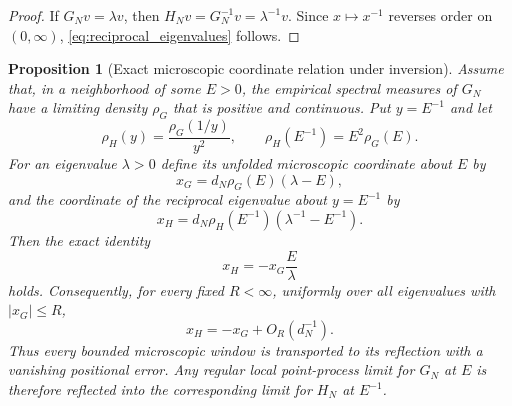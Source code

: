 \documentclass[11pt]{amsart}
\numberwithin{equation}{section}
\theoremstyle{plain}
\newtheorem{proposition}[theorem]{Proposition}
\theoremstyle{definition}
\theoremstyle{remark}
\begin{document}
\begin{proof}
If $G_Nv=\lambda v$, then $H_Nv=G_N^{-1}v=\lambda^{-1}v$.  Since $x\mapsto x^{-1}$ reverses order on $(0,\infty)$, \eqref{eq:reciprocal_eigenvalues} follows.
\end{proof}

\begin{proposition}[Exact microscopic coordinate relation under inversion]
\label{prop:local_inversion_equivalence}
Assume that, in a neighborhood of some $E>0$, the empirical spectral measures of $G_N$ have a limiting density $\rho_G$ that is positive and continuous.  Put $y=E^{-1}$ and let
\begin{equation}
\rho_H(y)=\frac{\rho_G(1/y)}{y^2},
\qquad
\rho_H(E^{-1})=E^2\rho_G(E).
\label{eq:pushforward_density}
\end{equation}
For an eigenvalue $\lambda>0$ define its unfolded microscopic coordinate about $E$ by
\begin{equation}
x_G=d_N\rho_G(E)(\lambda-E),
\end{equation}
and the coordinate of the reciprocal eigenvalue about $y=E^{-1}$ by
\begin{equation}
x_H=d_N\rho_H(E^{-1})(\lambda^{-1}-E^{-1}).
\end{equation}
Then the exact identity
\begin{equation}
x_H=-x_G\frac{E}{\lambda}
\label{eq:exact_local_inversion_coordinate}
\end{equation}
holds.  Consequently, for every fixed $R<\infty$, uniformly over all eigenvalues with $|x_G|\le R$,
\begin{equation}
x_H=-x_G+O_R(d_N^{-1}).
\label{eq:uniform_local_inversion}
\end{equation}
Thus every bounded microscopic window is transported to its reflection with a vanishing positional error.  Any regular local point-process limit for $G_N$ at $E$ is therefore reflected into the corresponding limit for $H_N$ at $E^{-1}$.
\end{proposition}
\end{document}
